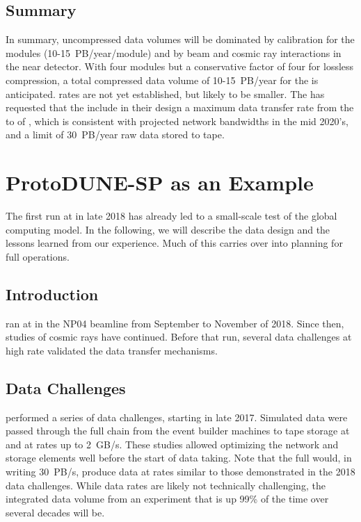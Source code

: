 \subsection{Summary}
In summary, uncompressed data volumes will be dominated by calibration for the  modules (10-15~PB/year/module) and by beam and cosmic ray interactions in the near detector.  With four  modules but a conservative factor of four for lossless compression, a total compressed data volume of 10-15~PB/year for the  is anticipated.  rates are not yet established, but likely to be smaller.   
The  has requested that the   %
include %
in their design a  maximum data transfer rate from the  to  of \surffnalbw, which is consistent with projected network bandwidths in the mid 2020's, and a limit of \SI{30}{PB/year} raw data stored to tape.  


\section{ProtoDUNE-SP as an Example}
\label{ch:exec-comp-proto-SP}
The first   run at  in late 2018 has already led to a small-scale test of the global computing model.  In the following, we will describe the  data design and the lessons learned from our experience. Much of this carries over into planning for full  operations. 

\subsection{Introduction}

 ran at  in the NP04 beamline from September to November of 2018. Since then, studies of cosmic rays have continued. Before that run, several data challenges at high rate validated the data transfer mechanisms. 

\subsection{Data Challenges}

 performed a series of data challenges, starting in late 2017.  Simulated data were passed through the full chain from the event builder machines to tape storage at  and  at rates up to \SI{2}{GB/s}.  These studies allowed optimizing the network and storage elements well before the start of data taking.
Note that the full   would, in writing \SI{30}{PB/s}, produce data at rates similar to  those demonstrated in the 2018 data challenges. While data rates are likely not technically challenging, the integrated data volume from an experiment that is up 99\% of the time over several decades will be. 


